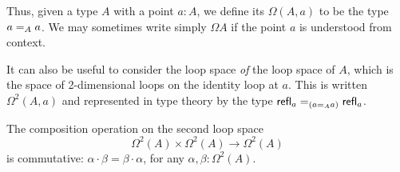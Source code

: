 \begin{definition}

Thus, given a type $A$ with a point $a:A$, we define its 
%
$\Omega(A,a)$ to be the type $\id[A]{a}{a}$.
We may sometimes write simply $\Omega A$ if the point $a$ is understood from context.

\end {definition}


\begin{definition}
It can also be useful to consider the loop space \emph{of} the loop space of $A$, which is the space of 2-dimensional loops on the identity loop at $a$.
This is written $\Omega^2(A,a)$ and represented in type theory by the type $\id[({\id[A]{a}{a}})]{\refl{a}}{\refl{a}}$.
\end {definition}

\begin{thm}%
  The composition operation on the second loop space
  \begin{equation*}
    \Omega^2(A)\times \Omega^2(A)\to \Omega^2(A)
  \end{equation*}
  is commutative: $\alpha\cdot\beta = \beta\cdot\alpha$, for any $\alpha, \beta:\Omega^2(A)$.
\end{thm}

